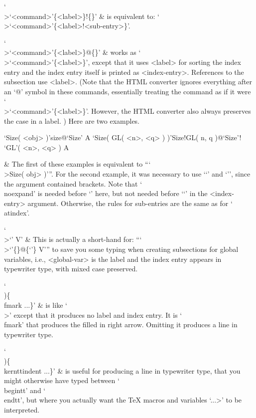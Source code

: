 `\\>\lq<command>\rq\{<label>\}!\{<sub-entry>\}' &
    is equivalent to: `\\>\lq<command>\rq\{<label>!<sub-entry>\}'.

`\\>\lq<command>\rq\{<label>\}@\{<index-entry>\}' &
    works as `\\>\lq<command>\rq\{<label>\}', except that it uses <label>
    for sorting the index entry and the index entry itself is printed  as
    <index-entry>. References to the subsection use <label>.  (Note  that
    the HTML converter ignores everything after an `@'  symbol  in  these
    commands,  essentially  treating  the   command   as   if   it   were
    `\\>\lq<command>\rq\{<label>\}'. However,  the  HTML  converter  also
    always preserves the case in a label. ) Here are two examples.

\begintt
\>`Size( <obj> )'{size}@{`Size'} A
\>`Size( GL( <n>, <q> ) )'{Size!GL( n, q )}@{`Size'! `GL'( \noexpand<n>, \noexpand<q> )} A
\endtt

  & The first of these examples is equivalent to ``{`\\>Size( \<obj> )'}''.
    For the second example, it was necessary  to  use  `\lq'  and  `\rq',
    since the argument contained  brackets.  Note  that  `\\noexpand'  is
    needed  before  `\<'  here,  but  not  needed  before  `\lq'  in  the
    <index-entry> argument. Otherwise, the rules for sub-entries are  the
    same as for `\\atindex'.

`\\>\lq<global-var>{\rq} V' &
    This is actually a short-hand for:
    ``{`\\>\lq<global-var>\rq\{<global-var>\}@\{\lq<global-var>\rq\} V'}''
    to  save  you  some  typing  when  creating  subsections  for  global
    variables, i.e., <global-var>  is  the  label  and  the  index  entry
    appears in typewriter type, with mixed case preserved.

`\\)\{\\fmark ...\}' &
    is like `\\>' except that it produces no label and index entry. It is
    `\\fmark' that produces  the  filled  in  right  arrow.  Omitting  it
    produces a line in typewriter type.

`\\)\{\\kernttindent ...\}' &
    is useful for producing a line in typewriter  type,  that  you  might
    otherwise have typed between `\\begintt' and `\\endtt', but where you
    actually  want  the  {\TeX}  macros  and  variables  `\<...>'  to  be
    interpreted.


